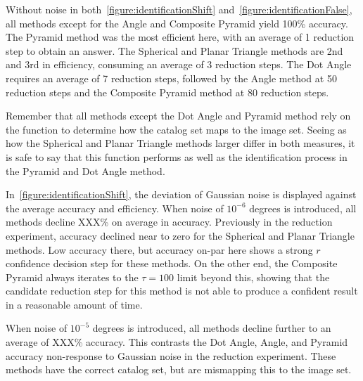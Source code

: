 Without noise in both~\autoref{figure:identificationShift} and~\autoref{figure:identificationFalse}, all methods except
for the Angle and Composite Pyramid yield 100\% accuracy.
The Pyramid method was the most efficient here, with an average of 1 reduction step to obtain an answer.
The Spherical and Planar Triangle methods are 2nd and 3rd in efficiency, consuming an average of 3 reduction steps.
The Dot Angle requires an average of 7 reduction steps, followed by the Angle method at 50 reduction steps and the
Composite Pyramid method at 80 reduction steps.

Remember that all methods except the Dot Angle and Pyramid method rely on the  function to determine how
the catalog set maps to the image set.
Seeing as how the Spherical and Planar Triangle methods larger differ in both measures, it is safe to say that this
function performs as well as the identification process in the Pyramid and Dot Angle method.

In~\autoref{figure:identificationShift}, the deviation of Gaussian noise is displayed against the average accuracy and
efficiency.
When noise of $10^{-6}$ degrees is introduced, all methods decline XXX\% on average in accuracy.
Previously in the reduction experiment, accuracy declined near to zero for the Spherical and Planar Triangle methods.
Low accuracy there, but accuracy on-par here shows a strong $r$ confidence decision step for these methods.
On the other end, the Composite Pyramid always iterates to the $\tau = 100$ limit beyond this, showing that the
candidate reduction step for this method is not able to produce a confident result in a reasonable amount of time.

When noise of $10^{-5}$ degrees is introduced, all methods decline further to an average of XXX\% accuracy.
This contrasts the Dot Angle, Angle, and Pyramid accuracy non-response to Gaussian noise in the reduction experiment.
These methods have the correct catalog set, but are mismapping this to the image set.

\begin{figure}
\end{figure}

